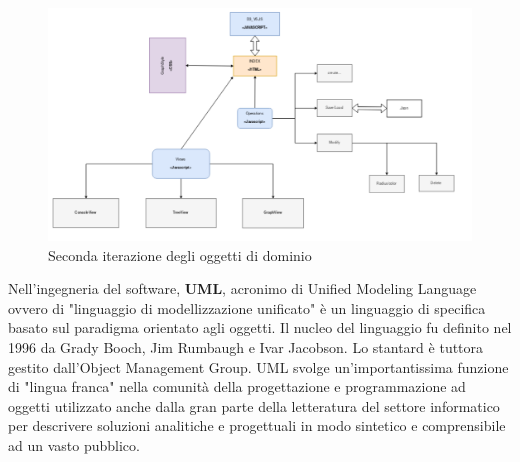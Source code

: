 {\begin{figure}[!htb]
	\begin{center}
		\includegraphics[width=1 \linewidth]{figure/secondaIterazione}
	\end{center}
	\caption{Seconda iterazione degli oggetti di dominio\label{fig:secondaIterazione}}
\end{figure}
Nell'ingegneria del software, \textbf{UML}, acronimo di Unified Modeling Language ovvero di "linguaggio di modellizzazione unificato" è un linguaggio di specifica basato sul paradigma orientato agli oggetti. Il nucleo del linguaggio fu definito nel 1996 da Grady Booch, Jim Rumbaugh e Ivar Jacobson. Lo stantard è tuttora gestito dall'Object Management Group. UML svolge un'importantissima funzione di "lingua franca" nella comunità della progettazione e programmazione ad oggetti utilizzato anche dalla gran parte della letteratura del settore informatico per descrivere soluzioni analitiche e progettuali in modo sintetico e comprensibile ad un vasto pubblico.
}
